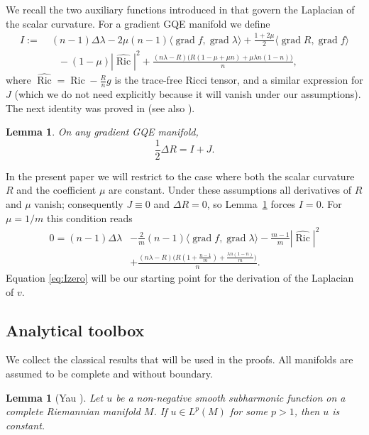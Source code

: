 \documentclass[10pt,a4paper]{amsart}
\newcommand{\Ric}{\operatorname{Ric}}
\newcommand{\grad}{\operatorname{grad}}
\newtheorem{lemma}[theorem]{Lemma}
\begin{document}
We recall the two auxiliary functions introduced in \cite{Mir14} that govern the Laplacian of the scalar curvature.
For a gradient GQE manifold we define
\[
\begin{aligned}
I :=&\; (n-1)\Delta\lambda - 2\mu(n-1)\langle\grad f,\grad\lambda\rangle + \frac{1+2\mu}{2}\langle\grad R,\grad f\rangle \\
&\quad - (1-\mu)|\hat{\Ric}|^2 + \frac{(n\lambda-R)\bigl(R(1-\mu+\mu n) + \mu\lambda n(1-n)\bigr)}{n},
\end{aligned}
\]
where $\hat{\Ric} = \Ric - \frac{R}{n}g$ is the trace-free Ricci tensor, and a similar expression for $J$ (which we do not need explicitly because it will vanish under our assumptions).
The next identity was proved in \cite{Mir14} (see also \cite{Mir15}).
\begin{lemma}\label{lem:I}
On any gradient GQE manifold,
\begin{equation}
\frac12\Delta R = I + J. \label{eq:DeltaR}
\end{equation}
\end{lemma}

In the present paper we will restrict to the case where both the scalar curvature $R$ and the coefficient $\mu$ are constant.
Under these assumptions all derivatives of $R$ and $\mu$ vanish; consequently $J\equiv 0$ and $\Delta R=0$, so Lemma~\ref{lem:I} forces $I=0$.
For $\mu=1/m$ this condition reads
\begin{equation}
\begin{aligned}
0 = (n-1)\Delta\lambda &- \frac{2}{m}(n-1)\langle\grad f,\grad\lambda\rangle - \frac{m-1}{m}|\hat{\Ric}|^2 \\
&+ \frac{(n\lambda-R)\bigl(R(1+\frac{n-1}{m}) + \frac{\lambda n(1-n)}{m}\bigr)}{n}. \label{eq:Izero}
\end{aligned}
\end{equation}
Equation \eqref{eq:Izero} will be our starting point for the derivation of the Laplacian of $v$.

\subsection{Analytical toolbox}
\label{sec:toolbox}

We collect the classical results that will be used in the proofs.
All manifolds are assumed to be complete and without boundary.

\begin{lemma}[Yau \cite{Yau}]\label{lem:Yau}
Let $u$ be a non-negative smooth subharmonic function on a complete Riemannian manifold $M$.
If $u\in L^p(M)$ for some $p>1$, then $u$ is constant.
\end{lemma}
\end{document}
